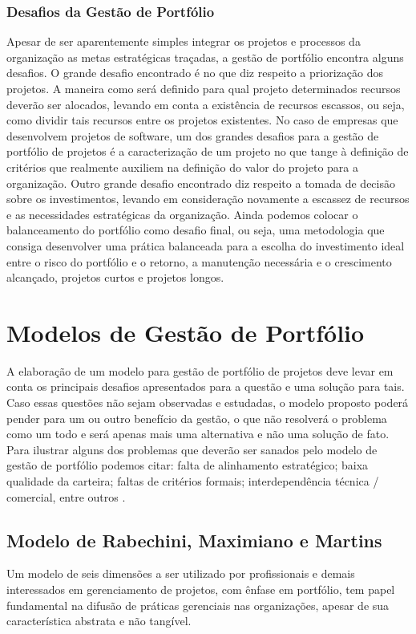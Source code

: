 \documentclass[a4paper,10pt]{article}
\begin{document}
\subsubsection{Desafios da Gestão de Portfólio}
\flushleft
Apesar de ser aparentemente simples integrar os projetos e processos da organização as metas estratégicas traçadas, a gestão de portfólio encontra alguns desafios. O grande desafio encontrado
é no que diz respeito a priorização dos projetos. A maneira como será definido para qual projeto determinados recursos deverão ser alocados, levando em conta a existência de recursos escassos, ou seja, como dividir tais recursos
entre os projetos existentes.
No caso de empresas que desenvolvem projetos de software, um dos grandes desafios para
a gestão de portfólio de projetos é a caracterização de um projeto no que tange à definição de
critérios que realmente auxiliem na definição do valor do projeto para a organização.
Outro grande desafio encontrado diz respeito a tomada de decisão  sobre os investimentos, levando em consideração novamente a escassez de recursos e as necessidades estratégicas da organização. Ainda podemos
colocar o balanceamento do portfólio como desafio final, ou seja, uma metodologia que consiga desenvolver uma prática balanceada para a escolha do investimento ideal entre o risco do portfólio e
o retorno, a manutenção necessária e o crescimento alcançado, projetos curtos e projetos longos.\cite{cooper}

\section{Modelos de Gestão de Portfólio}
\flushleft
A elaboração de um modelo para gestão de portfólio de projetos deve levar em conta os principais desafios apresentados para a questão e uma solução para tais.
Caso essas questões não sejam observadas e estudadas, o modelo proposto poderá pender para um ou outro benefício da gestão, o que não resolverá o problema como um
todo e será apenas mais uma alternativa e não uma solução de fato. Para ilustrar alguns dos problemas que deverão ser sanados pelo modelo de gestão de portfólio podemos
citar: falta de alinhamento estratégico; baixa qualidade da carteira; faltas de critérios formais; interdependência 
técnica / comercial, entre outros \cite{martino1, martino2, cooper}.

\subsection{Modelo de Rabechini, Maximiano e Martins}
\flushleft
Um modelo de seis dimensões a ser utilizado por profissionais e demais interessados em gerenciamento de projetos, com ênfase
em portfólio, tem papel fundamental na difusão de práticas gerenciais nas organizações, apesar de sua característica abstrata e não tangível.\cite{rabechini}
\end{document}
